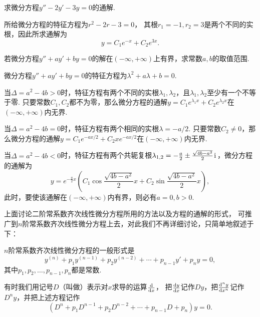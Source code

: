 \begin{example}
求微分方程\(y'' - 2y' - 3y = 0\)的通解.
\begin{solution}
所给微分方程的特征方程为\(r^2-2r-3=0\)，
其根\(r_1=-1, r_2=3\)是两个不同的实根，因此所求通解为\[
	y = C_1 e^{-x} + C_2 e^{3x}.
\]
\end{solution}
\end{example}

\begin{example}
若微分方程\(y''+ay'+by=0\)的解在\((-\infty,+\infty)\)上有界，求常数\(a,b\)的取值范围.
\begin{solution}
微分方程\(y''+ay'+by=0\)的特征方程为\(\lambda^2 + a\lambda+b = 0\).

当\(\Delta=a^2-4b>0\)时，特征方程有两个不同的实根\(\lambda_1,\lambda_2\)，且\(\lambda_1,\lambda_2\)至少有一个不等于零.
只要常数\(C_1,C_2\)都不为零，那么微分方程的通解\(y = C_1 e^{\lambda_1 x} + C_2 e^{\lambda_2 x}\)在\((-\infty,+\infty)\)内无界.

当\(\Delta=a^2-4b=0\)时，特征方程有两个相同的实根\(\lambda=-a/2\).
只要常数\(C_2\neq0\)，那么微分方程的通解\(y = C_1 e^{-ax/2} + C_2 x e^{-ax/2}\)在\((-\infty,+\infty)\)内无界.

当\(\Delta=a^2-4b<0\)时，特征方程有两个共轭复根\(\lambda_{1,2}=-\frac{a}{2}\pm\frac{\sqrt{4b-a^2}}{2}\kern1pt\mathrm{i}\kern1pt\)，微分方程的通解为\[
y = e^{-\frac{a}{2}x} \left( C_1 \cos\frac{\sqrt{4b-a^2}}{2}x + C_2 \sin\frac{\sqrt{4b-a^2}}{2}x \right),
\]此时，要使该通解在\((-\infty,+\infty)\)内有界，则必有\(a = 0, b > 0\).
\end{solution}
\end{example}

上面讨论二阶常系数齐次线性微分方程所用的方法以及方程的通解的形式，
可推广到\(n\)阶常系数齐次线性微分方程上去，对此我们不再详细讨论，只简单地叙述于下：

\(n\)阶常系数齐次线性微分方程的一般形式是
\begin{equation}\label{equation:微分方程概论.n阶常系数齐次线性微分方程的一般形式}
y^{(n)} + p_1 y^{(n-1)} + p_2 y^{(n-2)} + \dotsb + p_{n-1} y' + p_n y = 0,
\end{equation}
其中\(p_1,p_2,\dotsc,p_{n-1},p_n\)都是常数.

有时我们用记号\(D\)（叫做）表示对\(x\)求导的运算\(\dv{x}\)，
把\(\dv{y}{x}\)记作\(Dy\)，把\(\dv[n]{y}{x}\)记作\(D^n y\)，并把上述方程记作
\begin{equation}\label{equation:微分方程概论.n阶常系数齐次线性微分方程的一般形式.用微分算子改写}
(D^n + p_1 D^{n-1} + p_2 D^{n-2} + \dotsb + p_{n-1} D + p_n) y = 0.
\end{equation}

